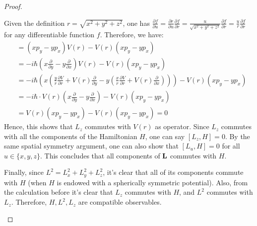 \documentclass{article}
\begin{document}
\begin{proof}
\begin{itemize}
        Given the definition $r=\sqrt{x^2+y^2+z^2}$, one has $\frac{\partial f}{\partial u} = \frac{\partial r}{\partial u}\frac{\partial f}{\partial r} = \frac{u}{\sqrt{x^2+y^2+z^2}}\frac{\partial f}{\partial r} = \frac{u}{r}\frac{\partial f}{\partial r}$ for any differentiable function $f$. Therefore, we have:
        \begin{align}
            [L_z,V(r)] &= (xp_y-yp_x)V(r) - V(r)(xp_y-yp_x)\\
            &= -i\hbar \left(x\frac{\partial}{\partial y}-y\frac{\partial}{\partial x}\right)V(r) - V(r)(xp_y-yp_x)\\
            &= -i\hbar\left(x\left(\frac{y}{r}\frac{\partial V}{\partial r} + V(r)\frac{\partial}{\partial y}-y\left(\frac{x}{r}\frac{\partial V}{\partial r}+V(r)\frac{\partial}{\partial x}\right)\right)\right)- V(r)(xp_y-yp_x)\\
            &= -i\hbar \cdot V(r)(x\frac{\partial}{\partial y}-y\frac{\partial}{\partial x})-V(r)(xp_y-yp_x)\\
            &= V(r)(xp_y-yp_x)-V(r)(xp_y-yp_x)=0
        \end{align}
        Hence, this shows that $L_z$ commutes with $V(r)$ as operator. Since $L_z$ commutes with all the components of the Hamiltonian $H$, one can say $[L_z,H]=0$. By the same spatial symmetry argument, one can also show that $[L_u,H]=0$ for all $u\in\{x,y,z\}$. This concludes that all components of $\mathbf{L}$ commutes with $H$.

        Finally, since $L^2 = L_x^2+L_y^2+L_z^2$, it's clear that all of its components commute with $H$ (when $H$ is endowed with a spherically symmetric potential). Also, from the calculation before it's clear that $L_z$ commutes with $H$, and $L^2$ commutes with $L_z$. Therefore, $H,L^2,L_z$ are compatible observables.
    \end{itemize}
\end{proof}

\newpage
\end{document}
